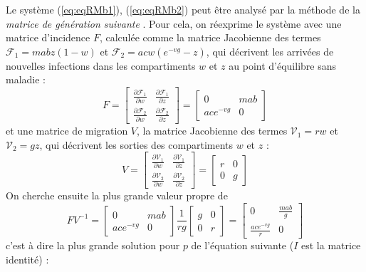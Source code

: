 Le système (\ref{eq:eqRMb1}), (\ref{eq:eqRMb2}) peut être analysé par la méthode de la\textit{ matrice de génération suivante} \cite{van2002reproduction}.
Pour cela, on réexprime le système avec une matrice d'incidence $F$, calculée comme la matrice Jacobienne des termes $\mathcal{F}_1=mabz(1-w)$ et $\mathcal{F}_2=acw(e^{-vg}-z)$, qui décrivent les arrivées de nouvelles infections dans les compartiments $w$ et $z$ au point d'équilibre sans maladie :
\begin{equation}
F= 
\begin{bmatrix} \frac{\partial \mathcal{F}_1 }{\partial w} & \frac{\partial \mathcal{F}_1 }{\partial z} \\ \frac{\partial \mathcal{F}_2 }{\partial w} & \frac{\partial \mathcal{F}_2 }{\partial z} \end{bmatrix} =
\begin{bmatrix} 0 & mab  \\ace^{-vg} & 0 \end{bmatrix}
\end{equation}
et une matrice de migration $V$, la matrice Jacobienne des termes $\mathcal{V}_1=rw$ et $\mathcal{V}_2=gz$, qui décrivent les sorties des compartiments $w$ et $z$ :
\begin{equation}
V=
\begin{bmatrix} \frac{\partial \mathcal{V}_1 }{\partial w} & \frac{\partial \mathcal{V}_1 }{\partial z} \\ \frac{\partial \mathcal{V}_2 }{\partial w} & \frac{\partial \mathcal{V}_2 }{\partial z} \end{bmatrix} =
\begin{bmatrix} r & 0 \\ 0 & g \end{bmatrix}
\end{equation}
On cherche ensuite la plus grande valeur propre de 
\begin{equation}
FV^{-1} = \begin{bmatrix} 0 & mab  \\ ace^{-vg} & 0 \end{bmatrix} \frac{1}{rg} \begin{bmatrix} g & 0 \\ 0 & r \end{bmatrix} = \begin{bmatrix} 0 & \frac{mab}{g}  \\ \frac{ace^{-vg}}{r} & 0 \end{bmatrix}
\end{equation}
c'est à dire la plus grande solution pour $p$ de l'équation suivante ($I$ est la matrice identité) :
